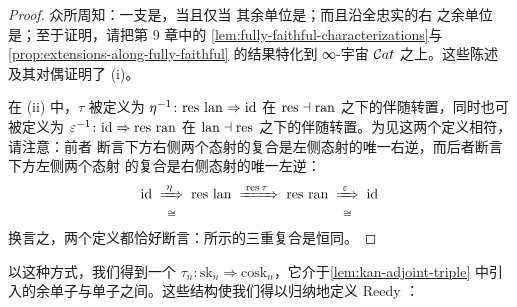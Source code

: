 \begin{proof}
众所周知：一支\trRightAdjoint{}\trFunctor{}是\trFullyFaithful{}，当且仅当
其余单位是\trIsomorphism；而且沿全忠实\trFunctor{}的\trPointwise{}右%
\trKanExtension{}之余单位是\trIsomorphism；至于证明，请把第 9 章中的%
\cref{lem:fully-faithful-characterizations}与\cref{prop:extensions-along-fully-faithful}
的结果特化到 ∞-宇宙 $\mathcal{C}at$ 之上。这些陈述及其对偶证明了 (i)。

在 (ii) 中，$\tau$ 被定义为 $\eta^{-1}\colon\mathrm{res}\,\operatorname{lan}\Rightarrow\mathrm{id}$
在 $\mathrm{res}\dashv\operatorname{ran}$ 之下的伴随转置，同时也可被定义为
$\varepsilon^{-1}\colon\mathrm{id}\Rightarrow\mathrm{res}\,\operatorname{ran}$ 在
$\operatorname{lan}\dashv\mathrm{res}$ 之下的伴随转置。为见这两个定义相符，请注意：前者
断言下方右侧两个态射的复合是左侧态射的唯一右逆，而后者断言下方左侧两个态射
的复合是右侧态射的唯一左逆：
\[
\mathrm{id}\;\underset{\cong}{\xRightarrow{\;\eta\;}}\;
\mathrm{res}\,\operatorname{lan}\;\xRightarrow{\;\mathrm{res}\,\tau\;}\;
\mathrm{res}\,\operatorname{ran}\;\underset{\cong}{\xRightarrow{\;\varepsilon\;}}\;
\mathrm{id}
\]
换言之，两个定义都恰好断言：所示的三重复合是恒同。
\end{proof}

以这种方式，我们得到一个\trNaturalTransformation{}
$\tau_n\colon\mathrm{sk}_n\Rightarrow\mathrm{cosk}_n$，它介于\cref{lem:kan-adjoint-triple}
中引入的余单子与单子之间。这些结构使我们得以归纳地定义 Reedy \trDiagram：

